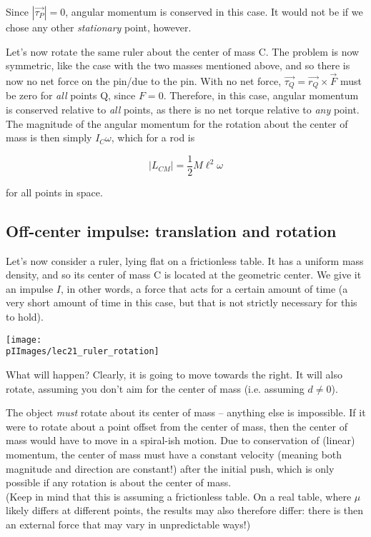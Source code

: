 Since $|\vec{\tau_P}| = 0$, angular momentum is conserved in this case. It would not be if we chose any other \emph{stationary} point, however.

Let's now rotate the same ruler about the center of mass C. The problem is now symmetric, like the case with the two masses mentioned above, and so there is now no net force on the pin/due to the pin. With no net force, $\vec{\tau_Q} = \vec{r_Q} \times \vec{F}$ must be zero for \emph{all} points Q, since $F = 0$. Therefore, in this case, angular momentum is conserved relative to \emph{all} points, as there is no net torque relative to \emph{any} point. The magnitude of the angular momentum for the rotation about the center of mass is then simply $I_C \omega$, which for a rod is

\begin{equation}
|L_{CM}| = \frac{1}{2} M \ell^2 \omega
\end{equation}

for all points in space.

\subsection{Off-center impulse: translation and rotation}

Let's now consider a ruler, lying flat on a frictionless table. It has a uniform mass density, and so its center of mass C is located at the geometric center. We give it an impulse $I$, in other words, a force that acts for a certain amount of time (a very short amount of time in this case, but that is not strictly necessary for this to hold).

\begin{center}
\texttt{[image: \\pIImages/lec21\_ruler\_rotation]}
\end{center}

What will happen? Clearly, it is going to move towards the right. It will also rotate, assuming you don't aim for the center of mass (i.e. assuming $d \neq 0$).

The object \emph{must} rotate about its center of mass -- anything else is impossible. If it were to rotate about a point offset from the center of mass, then the center of mass would have to move in a spiral-ish motion. Due to conservation of (linear) momentum, the center of mass must have a constant velocity (meaning both magnitude and direction are constant!) after the initial push, which is only possible if any rotation is about the center of mass.\\
(Keep in mind that this is assuming a frictionless table. On a real table, where $\mu$ likely differs at different points, the results may also therefore differ: there is then an external force that may vary in unpredictable ways!)

